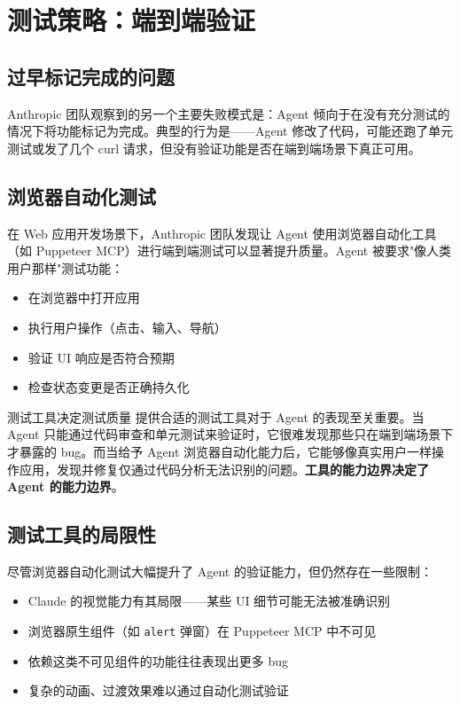 \section{测试策略：端到端验证}

\subsection{过早标记完成的问题}

Anthropic 团队观察到的另一个主要失败模式是：Agent 倾向于在没有充分测试的情况下将功能标记为完成。典型的行为是——Agent 修改了代码，可能还跑了单元测试或发了几个 curl 请求，但没有验证功能是否在端到端场景下真正可用。

\subsection{浏览器自动化测试}

在 Web 应用开发场景下，Anthropic 团队发现让 Agent 使用浏览器自动化工具（如 Puppeteer MCP）进行端到端测试可以显著提升质量。Agent 被要求"像人类用户那样"测试功能：

\begin{itemize}
    \item 在浏览器中打开应用
    \item 执行用户操作（点击、输入、导航）
    \item 验证 UI 响应是否符合预期
    \item 检查状态变更是否正确持久化
\end{itemize}

\begin{importantbox}{测试工具决定测试质量}
提供合适的测试工具对于 Agent 的表现至关重要。当 Agent 只能通过代码审查和单元测试来验证时，它很难发现那些只在端到端场景下才暴露的 bug。而当给予 Agent 浏览器自动化能力后，它能够像真实用户一样操作应用，发现并修复仅通过代码分析无法识别的问题。\textbf{工具的能力边界决定了 Agent 的能力边界}。
\end{importantbox}

\subsection{测试工具的局限性}

尽管浏览器自动化测试大幅提升了 Agent 的验证能力，但仍然存在一些限制：

\begin{itemize}
    \item Claude 的视觉能力有其局限——某些 UI 细节可能无法被准确识别
    \item 浏览器原生组件（如 \texttt{alert} 弹窗）在 Puppeteer MCP 中不可见
    \item 依赖这类不可见组件的功能往往表现出更多 bug
    \item 复杂的动画、过渡效果难以通过自动化测试验证
\end{itemize}

